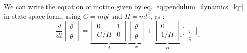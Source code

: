 We can write the equation of motino given by eq. \eqref{eq:pendulum_dynamics_lqr} in state-space form, using $G=mgl$ and $H=ml^2$, as :
\begin{equation}
\frac{d}{dt} 
\begin{bmatrix}
    \theta \\
    \dot{\theta} 
\end{bmatrix}
= 
\underbrace{
\begin{bmatrix}
    0 & 1 \\
    G/H & 0 
\end{bmatrix}
}_{A}
\underbrace{
\begin{bmatrix}
    \theta \\
    \dot{\theta} 
\end{bmatrix}
}_{x}
+
\underbrace{
\begin{bmatrix}
    0 \\
    1/H
\end{bmatrix}
}_{B}
\underbrace{
\begin{bmatrix}
    \tau
\end{bmatrix}
}_{u}
\end{equation}

